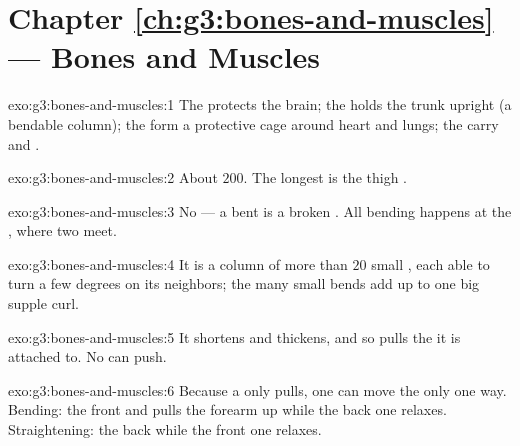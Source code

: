 \section*{Chapter \ref{ch:g3:bones-and-muscles} --- Bones and Muscles}

\begin{solution}{exo:g3:bones-and-muscles:1}
The  protects the brain; the  holds the trunk upright
(a bendable column); the  form a protective cage around
heart and lungs; the   carry  and .
\end{solution}

\begin{solution}{exo:g3:bones-and-muscles:2}
About $200$. The longest is the thigh .
\end{solution}

\begin{solution}{exo:g3:bones-and-muscles:3}
No --- a bent  is a broken . All bending happens at the
, where two  meet.
\end{solution}

\begin{solution}{exo:g3:bones-and-muscles:4}
It is a column of more than $20$ small , each able to turn
a few degrees on its neighbors; the many small bends add up to
one big supple curl.
\end{solution}

\begin{solution}{exo:g3:bones-and-muscles:5}
It shortens and thickens, and so pulls the  it is attached
to. No  can push.
\end{solution}

\begin{solution}{exo:g3:bones-and-muscles:6}
Because a  only pulls, one  can move the  only
one way. Bending: the front   and pulls the
forearm up while the back one relaxes. Straightening: the back
  while the front one relaxes.
\end{solution}


